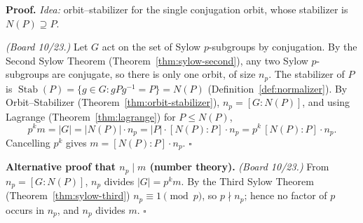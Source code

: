 \documentclass[11pt]{report}
\renewenvironment{proof}[1][Proof]{\noindent\textbf{#1.} }{\hfill$\square$\par\vspace{5pt}}
\begin{document}
\begin{proof}
\textit{Idea:} orbit--stabilizer for the single conjugation orbit, whose stabilizer is $N(P) \supseteq P$.\par
\textit{(Board 10/23.)} Let $G$ act on the set of Sylow $p$-subgroups by conjugation. By the Second Sylow Theorem (Theorem~\ref{thm:sylow-second}), any two Sylow $p$-subgroups are conjugate, so there is only one orbit, of size $n_p$. The stabilizer of $P$ is $\operatorname{Stab}(P) = \{g \in G : gPg^{-1} = P\} = N(P)$ (Definition~\ref{def:normalizer}). By Orbit--Stabilizer (Theorem~\ref{thm:orbit-stabilizer}), $n_p = [G : N(P)]$, and using Lagrange (Theorem~\ref{thm:lagrange}) for $P \leq N(P)$,
\[ p^k m = |G| = |N(P)| \cdot n_p = |P| \cdot [N(P) : P] \cdot n_p = p^k \, [N(P) : P] \cdot n_p. \]
Cancelling $p^k$ gives $m = [N(P) : P] \cdot n_p$.
\end{proof}

\begin{proof}[Alternative proof that $n_p \mid m$ (number theory)]
\textit{(Board 10/23.)} From $n_p = [G : N(P)]$, $n_p$ divides $|G| = p^k m$. By the Third Sylow Theorem (Theorem~\ref{thm:sylow-third}) $n_p \equiv 1 \pmod p$, so $p \nmid n_p$; hence no factor of $p$ occurs in $n_p$, and $n_p$ divides $m$.
\end{proof}

\begin{center}
\end{center}
\end{document}
